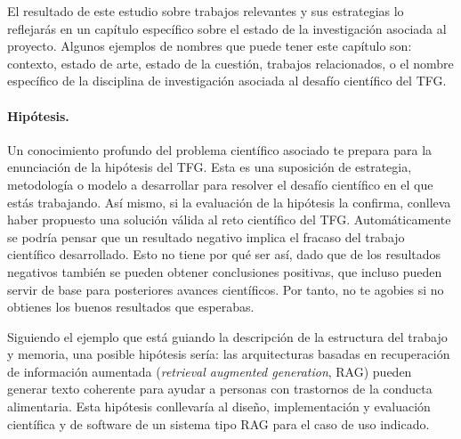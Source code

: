 El resultado de este estudio sobre trabajos relevantes y sus estrategias lo reflejarás en un capítulo específico sobre el estado de la investigación asociada al proyecto. Algunos ejemplos de nombres que puede tener este capítulo son: contexto, estado de arte, estado de la cuestión, trabajos relacionados, o el nombre específico de la disciplina de investigación asociada al desafío científico del TFG.

\paragraph{Hipótesis\textnormal{.}} Un conocimiento profundo del problema científico asociado te prepara para la enunciación de la hipótesis del TFG. Esta es una suposición de estrategia, metodología o modelo a desarrollar para resolver el desafío científico en el que estás trabajando. Así mismo, si la evaluación de la hipótesis la confirma, conlleva haber propuesto una solución válida al reto científico del TFG. Automáticamente se podría pensar que un resultado negativo implica el fracaso del trabajo científico desarrollado. Esto no tiene por qué ser así, dado que de los resultados negativos también se pueden obtener conclusiones positivas, que incluso pueden servir de base para posteriores avances científicos. Por tanto, no te agobies si no obtienes los buenos resultados que esperabas. 

Siguiendo el ejemplo que está guiando la descripción de la estructura del trabajo y memoria, una posible hipótesis sería: las arquitecturas basadas en recuperación de información aumentada (\textit{retrieval augmented generation}, RAG) pueden generar texto coherente para ayudar a personas con trastornos de la conducta alimentaria. Esta hipótesis conllevaría al diseño, implementación y evaluación científica y de software de un sistema tipo RAG para el caso de uso indicado.


